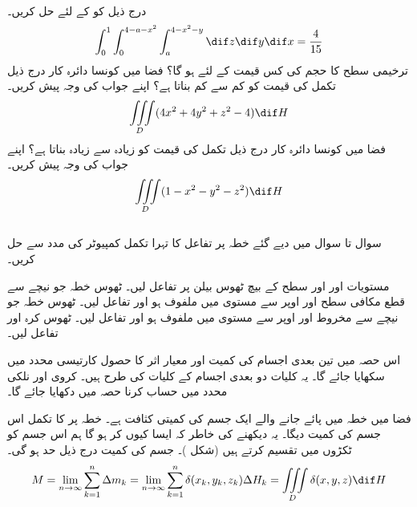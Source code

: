 \\
درج ذیل کو  کے لئے حل کریں۔
\begin{align*}
\int_0^1\int_0^{4-a-x^2}\int_a^{4-x^2-y}\dif z\dif y\dif x=\frac{4}{15}
\end{align*}
ترخیمی سطح  کا حجم   کی کس قیمت کے لئے  ہو گا؟
فضا میں  کونسا دائرہ کار  درج ذیل تکمل کی قیمت کو کم سے کم بناتا ہے؟ اپنے جواب کی وجہ پیش کریں۔
\begin{align*}
\iiint\limits_D (4x^2+4y^2+z^2-4)\dif H
\end{align*}
فضا میں کونسا دائرہ کار  درج ذیل تکمل کی قیمت کو زیادہ سے زیادہ بناتا ہے؟ اپنے جواب کی وجہ پیش کریں۔
\begin{align*}
\iiint\limits_D (1-x^2-y^2-z^2)\dif H
\end{align*}
\\
سوال  تا سوال  میں دیے گئے خطہ پر  تفاعل کا تہرا تکمل کمپیوٹر کی مدد سے حل کریں۔

مستویات  اور   اور سطح  کے بیچ ٹھوس بیلن پر تفاعل   لیں۔
ٹھوس خطہ جو نیچے سے   قطع مکافی سطح   اور اوپر سے مستوی   میں ملفوف ہو اور تفاعل  لیں۔
ٹھوس خطہ جو نیچے سے مخروط  اور اوپر سے مستوی  میں ملفوف ہو  اور تفاعل لیں۔ 
ٹھوس کرہ   اور تفاعل  لیں۔

اس حصہ میں تین بعدی اجسام کی  کمیت اور معیار اثر کا حصول کارتیسی محدد میں سکھایا جائے گا۔ یہ کلیات دو بعدی  اجسام کے کلیات کی طرح ہیں۔ کروی اور نلکی محدد میں حساب کرنا  حصہ  میں دکھایا جائے گا۔

فضا میں خطہ  میں پائے جانے والے ایک جسم کی  کمیتی کثافت  ہے۔ خطہ  پر  کا تکمل اس جسم کی کمیت دیگا۔ یہ دیکھنے کی خاطر کہ ایسا کیوں  کر ہو گا  ہم  اس جسم کو  ٹکڑوں  میں تقسیم کرتے ہیں (شکل )۔ جسم کی کمیت درج ذیل حد ہو گی۔
\begin{align}\label{مساوات_بالکثرت_تین_بعدی_کمیت}
M=\lim_{n\to\infty}\sum_{k=1}^{n}\Delta m_k=\lim_{n\to\infty}\sum_{k=1}^{n}\delta(x_k,y_k,z_k)\Delta H_k=\iiint\limits_D \delta(x,y,z) \dif H
\end{align}

